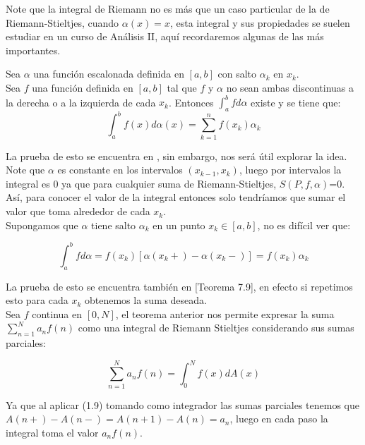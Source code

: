 Note que la integral de Riemann no es más que un caso particular de la de Riemann-Stieltjes, cuando $\alpha(x)=x$, esta integral y sus propiedades se suelen estudiar en un curso de Análisis II, aquí recordaremos algunas de  las más importantes.\\

\begin{theorem}
  Sea $\alpha$ una función escalonada definida en $[a, b]$ con salto $\alpha_k$ en $x_k$.\\
  
Sea $f$ una función definida en $[a, b]$ tal que $f$ y $\alpha$ no sean ambas discontinuas a la derecha o a la izquierda de cada $x_k$. Entonces $\displaystyle\int_a^b f d \alpha$ existe y se tiene que:
$$
\int_a^b f(x) d \alpha(x)=\sum_{k=1}^n f\left(x_k\right) \alpha_k
$$
\end{theorem}

La prueba de esto se encuentra en \cite{Apostol:105425}, sin embargo, nos será útil explorar la idea.\\

Note que $\alpha$ es constante en los intervalos $(x_{k-1},x_k)$, luego por intervalos la integral es 0 ya que para cualquier suma de Riemann-Stieltjes, $S(P,f,\alpha)$=0. Así, para conocer el valor de la integral entonces solo tendríamos que sumar el valor que toma alrededor de cada $x_k$.\\

Supongamos que $\alpha$ tiene salto $\alpha_k $ en un punto $x_k\in [a,b]$, no es difícil ver que:

\begin{equation}
\int_a^bfd\alpha=f(x_k)[\alpha(x_k+)-\alpha(x_{k}-)]=f(x_k)\alpha_k
\end{equation}

La prueba de esto se encuentra también en \cite{Apostol:105425} [Teorema 7.9], en efecto si repetimos esto para cada $x_k$ obtenemos la suma deseada.\\

Sea $f$ continua en $[0,N]$, el teorema anterior nos permite expresar la suma $\displaystyle\sum_{n=1}^Na_nf(n)$ como una integral de Riemann Stieltjes considerando sus sumas parciales:

$$\displaystyle\sum_{n=1}^Na_nf(n)=\int_0^Nf(x)dA(x)$$

Ya que al aplicar (1.9) tomando como integrador las sumas parciales tenemos que $A(n+)-A(n-)=A(n+1)-A(n)=a_n$, luego en cada paso la integral toma el valor $a_nf(n)$.\\

